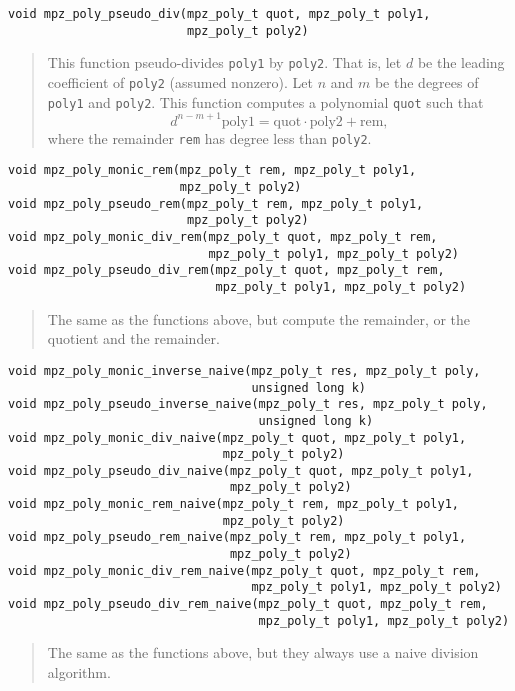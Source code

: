 \documentclass[a4paper,10pt]{article}
\newcommand{\code}{\lstinline}
\begin{document}
\begin{lstlisting}
void mpz_poly_pseudo_div(mpz_poly_t quot, mpz_poly_t poly1,
                         mpz_poly_t poly2)
\end{lstlisting}
\begin{quote}
This function pseudo-divides \code{poly1} by \code{poly2}. That is, let $d$ be the leading coefficient of \code{poly2} (assumed nonzero). Let $n$ and $m$ be the degrees of \code{poly1} and \code{poly2}. This function computes a polynomial \code{quot} such that
 \[ d^{n-m+1} \text{poly1} = \text{quot} \cdot \text{poly2} + \text{rem}, \]
where the remainder \code{rem} has degree less than \code{poly2}.
\end{quote}


\begin{lstlisting}
void mpz_poly_monic_rem(mpz_poly_t rem, mpz_poly_t poly1,
                        mpz_poly_t poly2)
void mpz_poly_pseudo_rem(mpz_poly_t rem, mpz_poly_t poly1,
                         mpz_poly_t poly2)
void mpz_poly_monic_div_rem(mpz_poly_t quot, mpz_poly_t rem,
                            mpz_poly_t poly1, mpz_poly_t poly2)
void mpz_poly_pseudo_div_rem(mpz_poly_t quot, mpz_poly_t rem, 
                             mpz_poly_t poly1, mpz_poly_t poly2)
\end{lstlisting}
\begin{quote}
The same as the functions above, but compute the remainder, or the quotient and the remainder.
\end{quote}


\begin{lstlisting}
void mpz_poly_monic_inverse_naive(mpz_poly_t res, mpz_poly_t poly,
                                  unsigned long k)
void mpz_poly_pseudo_inverse_naive(mpz_poly_t res, mpz_poly_t poly,
                                   unsigned long k)
void mpz_poly_monic_div_naive(mpz_poly_t quot, mpz_poly_t poly1,
                              mpz_poly_t poly2)
void mpz_poly_pseudo_div_naive(mpz_poly_t quot, mpz_poly_t poly1,
                               mpz_poly_t poly2)
void mpz_poly_monic_rem_naive(mpz_poly_t rem, mpz_poly_t poly1,
                              mpz_poly_t poly2)
void mpz_poly_pseudo_rem_naive(mpz_poly_t rem, mpz_poly_t poly1,
                               mpz_poly_t poly2)
void mpz_poly_monic_div_rem_naive(mpz_poly_t quot, mpz_poly_t rem,
                                  mpz_poly_t poly1, mpz_poly_t poly2)
void mpz_poly_pseudo_div_rem_naive(mpz_poly_t quot, mpz_poly_t rem, 
                                   mpz_poly_t poly1, mpz_poly_t poly2)
\end{lstlisting}
\begin{quote}
The same as the functions above, but they always use a naive division algorithm.
\end{quote}
\end{document}
